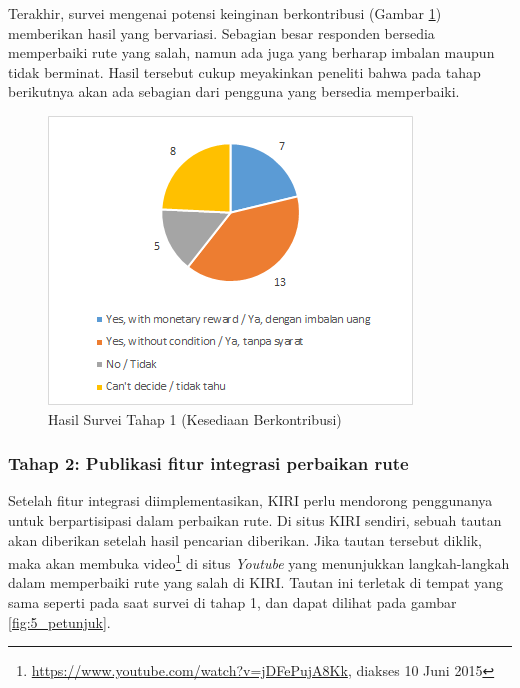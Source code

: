 Terakhir, survei mengenai potensi keinginan berkontribusi (Gambar \ref{fig:5_hasilsurvei_1_3}) memberikan hasil yang bervariasi. Sebagian besar responden bersedia memperbaiki rute yang salah, namun ada juga yang berharap imbalan maupun tidak berminat. Hasil tersebut cukup meyakinkan peneliti bahwa pada tahap berikutnya akan ada sebagian dari pengguna yang bersedia memperbaiki.

\begin{figure}
	\centering
	\includegraphics[scale=0.75]{Gambar/5_hasilsurvei_1_3}
	\caption{Hasil Survei Tahap 1 (Kesediaan Berkontribusi)} 
	\label{fig:5_hasilsurvei_1_3}
\end{figure}

\subsubsection{Tahap 2: Publikasi fitur integrasi perbaikan rute}

Setelah fitur integrasi diimplementasikan, KIRI perlu mendorong penggunanya untuk berpartisipasi dalam perbaikan rute. Di situs KIRI sendiri, sebuah tautan akan diberikan setelah hasil pencarian diberikan. Jika tautan tersebut diklik, maka akan membuka video\footnote{\url{https://www.youtube.com/watch?v=jDFePujA8Kk}, diakses 10 Juni 2015} di situs \textit{Youtube} yang menunjukkan langkah-langkah dalam memperbaiki rute yang salah di KIRI. Tautan ini terletak di tempat yang sama seperti pada saat survei di tahap 1, dan dapat dilihat pada gambar \ref{fig:5_petunjuk}.

